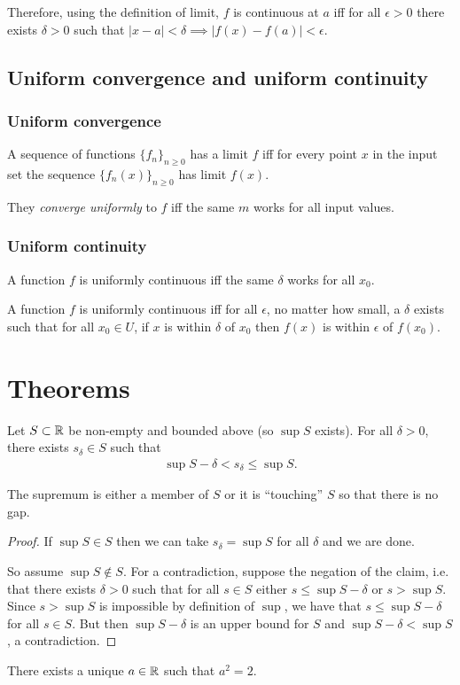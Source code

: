 Therefore, using the definition of limit, $f$ is continuous at $a$ iff for all $\epsilon > 0$
there exists $\delta > 0$ such that $|x - a| < \delta \implies |f(x) - f(a)| < \epsilon$.

\subsection{Uniform convergence and uniform continuity}

\subsubsection{Uniform convergence}
A sequence of functions $\{f_n\}_{n\geq 0}$ has a limit $f$ iff for every point
$x$ in the input set the sequence $\{f_n(x)\}_{n\geq 0}$ has limit $f(x)$.

They \textit{converge uniformly} to $f$ iff the same $m$ works for all input
values.

\subsubsection{Uniform continuity}
A function $f$ is uniformly continuous iff the same $\delta$ works for all $x_0$.

A function $f$ is uniformly continuous iff for all $\epsilon$, no matter how
small, a $\delta$ exists such that for all $x_0 \in U$, if $x$ is within
$\delta$ of $x_0$ then $f(x)$ is within $\epsilon$ of $f(x_0)$.

\section{Theorems}

\begin{theorem*}
  Let $S \subset \mathbb{R}$ be non-empty and bounded above (so $\sup S$ exists). For all $\delta > 0$,
  there exists $s_\delta \in S$ such that
  \begin{align*}
    \sup S - \delta < s_\delta \leq \sup S.
  \end{align*}
  \begin{intuition*}
    The supremum is either a member of $S$ or it is ``touching'' $S$ so that there is no gap.
  \end{intuition*}
  \begin{proof}
    If $\sup S \in S$ then we can take $s_\delta = \sup S$ for all $\delta$ and we are done.

    So assume $\sup S \not\in S$. For a contradiction, suppose the negation of the claim, i.e. that
    there exists $\delta > 0$ such that for all $s \in S$ either $s \leq \sup S - \delta$ or
    $s > \sup S$. Since $s > \sup S$ is impossible by definition of $\sup$, we have that
    $s \leq \sup S - \delta$ for all $s \in S$. But then $\sup S - \delta$ is an upper bound for
    $S$ and $\sup S - \delta < \sup S$, a contradiction.
  \end{proof}
\end{theorem*}
\begin{theorem*}
  There exists a unique $a \in \mathbb{R}$ such that $a^2 = 2$.
\end{theorem*}

